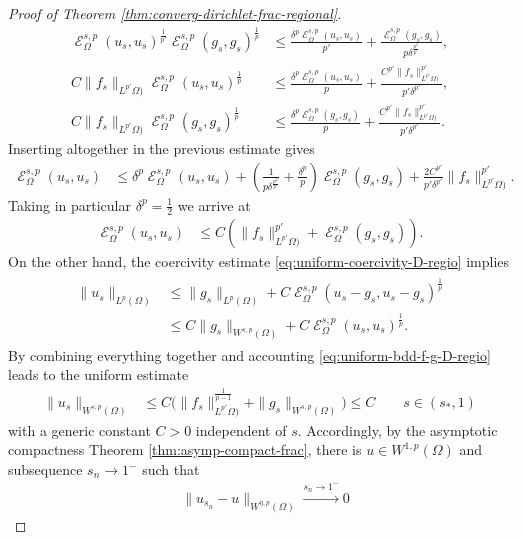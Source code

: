 \documentclass[12pt, reqno]{amsart}%
\theoremstyle{plain}  %
\theoremstyle{definition}  %
\theoremstyle{remark}
\numberwithin{equation}{section}
\DeclareMathOperator{\cE}{\mathcal{E}}
\begin{document}
\begin{proof}[Proof of Theorem \ref{thm:converg-dirichlet-frac-regional}]
\begin{align*}
\cE^{s,p}_\Omega(u_s,u_s)^{\frac{1}{p'}}\cE^{s,p}_\Omega(g_s,g_s)^{\frac{1}{p}}
&\leq  \frac{\delta^{p}\cE^{s,p}_\Omega(u_s,u_s)}{p'}+ \frac{\cE^{s,p}_\Omega(g_s,g_s)}{p\delta^{\frac{p^2}{p'}}},\\
%
C\|f_s\|_{L^{p'}\Omega)} \cE^{s,p}_\Omega(u_s,u_s)^{\frac{1}{p}}
&\leq  \frac{\delta^p\cE^{s,p}_\Omega(u_s,u_s)}{p}+ \frac{C^{p'}\|f_s\|_{L^{p'}\Omega)} ^{p'}}{p'\delta^{p'}},\\
%
C\|f_s\|_{L^{p'}\Omega)}\cE^{s,p}_\Omega(g_s,g_s)^{\frac{1}{p}}
&\leq \frac{\delta^{p}\cE^{s,p}_\Omega(g_s,g_s)}{p} + \frac{C^{p'}\|f_s\|_{L^{p'}\Omega)} ^{p'}}{p'\delta^{p'}}.
\end{align*}
Inserting altogether in the previous estimate gives
\begin{align*}
\cE^{s,p}_\Omega(u_s,u_s)
&\leq 	 \delta^{p}\cE^{s,p}_\Omega(u_s,u_s) + ( \frac{1}{p\delta^{\frac{p^2}{p'}}}+ \frac{\delta^{p}}{p}) \cE^{s,p}_\Omega(g_s,g_s)
+ \frac{2C^{p'}}{p'\delta^{p'}} \|f_s\|_{L^{p'}\Omega)} ^{p'}.
\end{align*}
\noindent Taking in particular  $\delta^p=\frac12$ we arrive at
\begin{align*}
\cE^{s,p}_\Omega(u_s,u_s)&\leq C(\|f_s\|_{L^{p'}\Omega)} ^{p'} + \cE^{s,p}_\Omega(g_s,g_s)) .
\end{align*}
On the other hand, the coercivity estimate \eqref{eq:uniform-coercivity-D-regio} implies
\begin{align}\label{eq:xlp-bound-dirich}
\begin{split}
\|u_s\|_{L^p(\Omega)}
&\leq  \|g_s\|_{L^p(\Omega)}+ C\cE^{s,p}_\Omega(u_s-g_s,u_s-g_s)^{\frac{1}{p}}\\
&\leq C\|g_s\|_{W^{s,p}(\Omega) }+ C\cE^{s,p}_\Omega(u_s,u_s)^{\frac{1}{p}}.
\end{split}
\end{align}
By combining everything together and accounting \eqref{eq:uniform-bdd-f-g-D-regio}  leads to the uniform estimate
\begin{align}\label{eq:unifo-bdedness-D}
\|u_s\|_{W^{s,p}(\Omega)}
&\leq C\big(\|f_s \|^{\frac{1}{p-1}}_{L^{p'}\Omega)}+\|g_s \|_{W^{s,p}(\Omega)}\big)
\leq C \qquad s\in (s_*,1)
\end{align}
with  a generic  constant  $C>0$ independent of $s$. Accordingly, by the asymptotic compactness
Theorem \ref{thm:asymp-compact-frac}, there is $u\in W^{1,p}(\Omega)$ and subsequence $s_n\to 1^-$ such that
\begin{align*}
&\|u_{s_n} -u\|_{W^{\eta,p}(\Omega)}\xrightarrow{s_n\to 1^-}0

\end{align*}
\end{proof}
\end{document}
